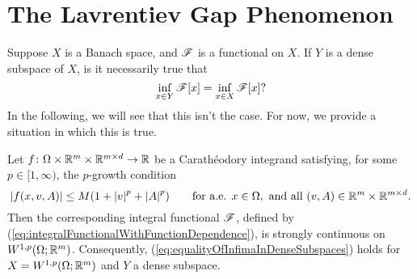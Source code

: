 \section{The Lavrentiev Gap Phenomenon}
Suppose $X$ is a Banach space, and $\mathscr{F}$ is a functional on $X$. If $Y$ is a dense subspace of $X$, is it necessarily true that 
\begin{equation} \label{eq:equalityOfInfimaInDenseSubspaces}
    \inf_{x \in Y} \mathscr{F}[x] = \inf_{x \in X} \mathscr{F}[x]?
\end{equation}
In the following, we will see that this isn't the case. For now, we provide a situation in which this is true.
\begin{theorem}
    Let $f \colon \Omega \times \mathbb{R}^m \times \mathbb{R}^{m \times d} \to \mathbb{R}$ be a Carath\'eodory integrand satisfying, for some $p \in [1,\infty)$, the $p$-growth condition
    \begin{equation}
        \left\lvert {f(x,v,A)} \right\rvert \leq M(1 + \left\lvert {v} \right\rvert^p + \left\lvert {A} \right\rvert^p) \hspace{20pt} \text{for a.e. } x \in \Omega, \text{ and all } (v,A) \in \mathbb{R}^m \times \mathbb{R}^{m \times d}.
    \end{equation}
    Then the corresponding integral functional $\mathscr{F}$, defined by (\ref{eq:integralFunctionalWithFunctionDependence}), is strongly continuous on $W^{1,p}(\Omega;\mathbb{R}^m)$. Consequently, (\ref{eq:equalityOfInfimaInDenseSubspaces}) holds for $X = W^{1,p}(\Omega;\mathbb{R}^m)$ and $Y$ a dense subspace.
\end{theorem}
